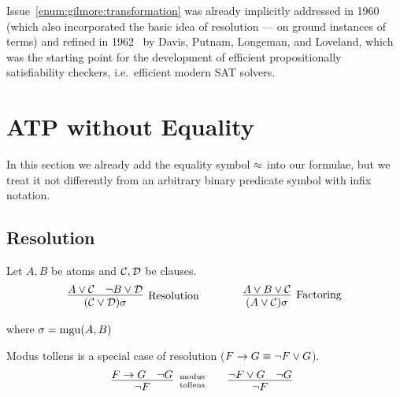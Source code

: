 Issue~\ref{enum:gilmore:transformation} was already implicitly
addressed in 1960~\cite{Davis:1960:CPQ:321033.321034}
(which also incorporated the basic idea of resolution --- on ground instances of terms)
and refined in 1962~\cite{Davis:1962:MPT:368273.368557}
by Davis, Putnam, Longeman, and Loveland,
which was the starting point for the development of efficient propositionally satisfiability checkers, i.e.~efficient modern SAT solvers.


\section{ATP without Equality}\label{sec:proving:without:equaltiy}

In this section we already add the equality symbol \( \approx \) into our formulae,
but we treat it not differently from an arbitrary binary predicate symbol with infix notation.

\subsection{Resolution}\label{sec:resolution}

\begin{definition}\label{def:resolution}
	Let \( A, B \) be atoms and
	\( \mathcal{C},\mathcal{D} \) be clauses.
	\begin{gather*}
	\infer
	[\text{Resolution}]
	{(\mcC\lor\mcD)\sigma}
	{A\lor\mcC&\lnot B\lor\mcD}
	\qquad\qquad
	\infer
	[\text{Factoring}]
	{(A\lor\mcC)\sigma}
	{A\lor B\lor\mcC}
	\end{gather*}
	\begin{center}
		where
		\( \sigma=\operatorname{mgu}(A,B) \)
	\end{center}
\end{definition}

\begin{example}Modus tollens is a special case of resolution (\( F\rightarrow G\equiv \lnot F\lor G \)).
	\begin{gather*}
	\infer[\text{modus}\atop\text{tollens}]{\lnot F}{F\limp G & \lnot G}
	\qquad
	\infer[]{\lnot F}{\lnot F\lor G & \lnot G}
	\end{gather*}
\end{example}


